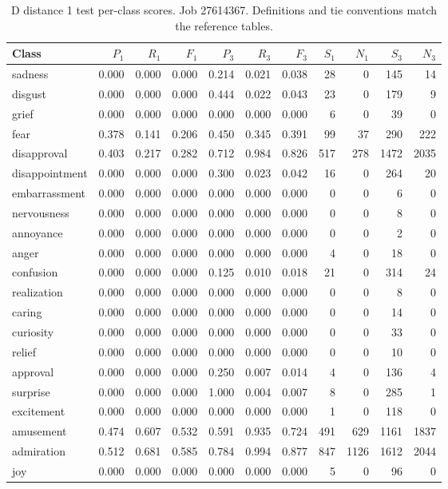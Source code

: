 \begin{table}[!htbp]
\centering
\scriptsize
\setlength{\tabcolsep}{5pt}
\begin{tabular}{lrrrrrrrrrr}
\toprule
Class & $P_1$ & $R_1$ & $F_1$ & $P_3$ & $R_3$ & $F_3$ & $S_1$ & $N_1$ & $S_3$ & $N_3$ \\
\midrule
sadness & 0.000 & 0.000 & 0.000 & 0.214 & 0.021 & 0.038 & 28 & 0 & 145 & 14 \\
disgust & 0.000 & 0.000 & 0.000 & 0.444 & 0.022 & 0.043 & 23 & 0 & 179 & 9 \\
grief & 0.000 & 0.000 & 0.000 & 0.000 & 0.000 & 0.000 & 6 & 0 & 39 & 0 \\
fear & 0.378 & 0.141 & 0.206 & 0.450 & 0.345 & 0.391 & 99 & 37 & 290 & 222 \\
disapproval & 0.403 & 0.217 & 0.282 & 0.712 & 0.984 & 0.826 & 517 & 278 & 1472 & 2035 \\
disappointment & 0.000 & 0.000 & 0.000 & 0.300 & 0.023 & 0.042 & 16 & 0 & 264 & 20 \\
embarrassment & 0.000 & 0.000 & 0.000 & 0.000 & 0.000 & 0.000 & 0 & 0 & 6 & 0 \\
nervousness & 0.000 & 0.000 & 0.000 & 0.000 & 0.000 & 0.000 & 0 & 0 & 8 & 0 \\
annoyance & 0.000 & 0.000 & 0.000 & 0.000 & 0.000 & 0.000 & 0 & 0 & 2 & 0 \\
anger & 0.000 & 0.000 & 0.000 & 0.000 & 0.000 & 0.000 & 4 & 0 & 18 & 0 \\
confusion & 0.000 & 0.000 & 0.000 & 0.125 & 0.010 & 0.018 & 21 & 0 & 314 & 24 \\
realization & 0.000 & 0.000 & 0.000 & 0.000 & 0.000 & 0.000 & 0 & 0 & 8 & 0 \\
caring & 0.000 & 0.000 & 0.000 & 0.000 & 0.000 & 0.000 & 0 & 0 & 14 & 0 \\
curiosity & 0.000 & 0.000 & 0.000 & 0.000 & 0.000 & 0.000 & 0 & 0 & 33 & 0 \\
relief & 0.000 & 0.000 & 0.000 & 0.000 & 0.000 & 0.000 & 0 & 0 & 10 & 0 \\
approval & 0.000 & 0.000 & 0.000 & 0.250 & 0.007 & 0.014 & 4 & 0 & 136 & 4 \\
surprise & 0.000 & 0.000 & 0.000 & 1.000 & 0.004 & 0.007 & 8 & 0 & 285 & 1 \\
excitement & 0.000 & 0.000 & 0.000 & 0.000 & 0.000 & 0.000 & 1 & 0 & 118 & 0 \\
amusement & 0.474 & 0.607 & 0.532 & 0.591 & 0.935 & 0.724 & 491 & 629 & 1161 & 1837 \\
admiration & 0.512 & 0.681 & 0.585 & 0.784 & 0.994 & 0.877 & 847 & 1126 & 1612 & 2044 \\
joy & 0.000 & 0.000 & 0.000 & 0.000 & 0.000 & 0.000 & 5 & 0 & 96 & 0 \\
\bottomrule
\end{tabular}
\caption{D distance 1 test per-class scores. Job 27614367. Definitions and tie conventions match the reference tables.}
\label{tab:classes-d_distance_k1}
\end{table}
